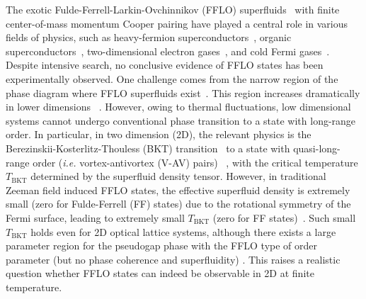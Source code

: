 \documentclass[prl,aps,twocolumn,showpacs, floatfix]{revtex4}
\begin{document}
The exotic Fulde-Ferrell-Larkin-Ovchinnikov (FFLO) superfluids~\cite%
{FuldePR1964,Larkin1964} with finite center-of-mass momentum Cooper pairing
have played a central role in various fields of physics, such as
heavy-fermion superconductors~\cite{HeavySC1,HeavySC2,HeavySC3}, organic
superconductors~\cite{OrganaticSC}, two-dimensional electron gases~\cite%
{Li2011Nature}, and cold Fermi gases~\cite{Hulet2010Nature}. Despite
intensive search, no conclusive evidence of FFLO states has been
experimentally observed. One challenge comes from the narrow region of the
phase diagram where FFLO superfluids exist~\cite{Leo2006PRL}. This region
increases dramatically in lower dimensions~\cite{Mueller2007PRL,Torma2008NJP}%
. However, owing to thermal fluctuations, low dimensional systems cannot
undergo conventional phase transition to a state with long-range order. In
particular, in two dimension (2D), the relevant physics is the
Berezinskii-Kosterlitz-Thouless (BKT) transition~\cite{Bere1971,Thouless} to
a state with quasi-long-range order (\textit{i.e.} vortex-antivortex (V-AV)
pairs) ~\cite{MeloPRL,LianyiHePRL,MingGongPRL}, with the critical
temperature $T_{\mathrm{BKT}}$ determined by the superfluid density tensor.
However, in traditional Zeeman field induced FFLO states, the effective
superfluid density is extremely small (zero for Fulde-Ferrell (FF) states)
due to the rotational symmetry of the Fermi surface, leading to extremely
small $T_{\mathrm{BKT}} $ (zero for FF states)~\cite%
{Vishwanath2009PRL,Torma2014PRB}. Such small $T_{\mathrm{BKT}}$ holds even
for 2D optical lattice systems, although there exists a large parameter
region for the pseudogap phase with the FFLO type of order parameter (but no
phase coherence and superfluidity) \cite{Torma2008NJP,Wolak2012PRA}. This
raises a realistic question whether FFLO states can indeed be observable in
2D at finite temperature.
\end{document}
